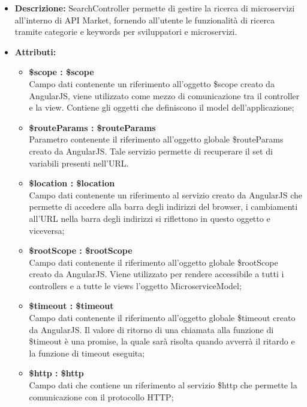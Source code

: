 \begin{itemize}
	\item \textbf{Descrizione:} SearchController permette di gestire la ricerca di microservizi all'interno
di API Market, fornendo all'utente le funzionalità di ricerca tramite
categorie e keywords per sviluppatori e microservizi.
	\item \textbf{Attributi:}
		\begin{itemize}
		
			\item \textbf{\$scope : \$scope}\\
			Campo dati contenente un riferimento all'oggetto \$scope creato da AngularJS, viene utilizzato come mezzo di comunicazione tra il controller e la view. Contiene gli oggetti che definiscono il model dell'applicazione;

			\item \textbf{\$routeParams : \$routeParams}\\
			Parametro contenente il riferimento all'oggetto globale \$routeParams creato da AngularJS. Tale servizio permette di recuperare il set di variabili presenti nell'URL.			
			
			\item \textbf{\$location : \$location}\\
			Campo dati contenente un riferimento al servizio creato da AngularJS che permette di accedere alla barra degli indirizzi del browser, i cambiamenti all'URL nella barra degli indirizzi si riflettono in questo oggetto e viceversa;
			
			\item \textbf{\$rootScope : \$rootScope}\\
			Campo dati contenente il riferimento all'oggetto globale \$rootScope creato da AngularJS. Viene utilizzato per rendere accessibile a tutti i controllers e a tutte le views l'oggetto MicroserviceModel;
			
			\item \textbf{\$timeout : \$timeout }\\
			Campo dati contenente il riferimento all'oggetto globale \$timeout creato da AngularJS. Il valore di ritorno di una chiamata alla funzione di \$timeout è una promise, la quale sarà risolta quando avverrà il ritardo e la funzione di timeout eseguita;

			\item \textbf{\$http : \$http }\\
			Campo dati che contiene un riferimento al servizio \$http che permette la comunicazione con il protocollo HTTP;
				

\end{itemize}
\end{itemize}
